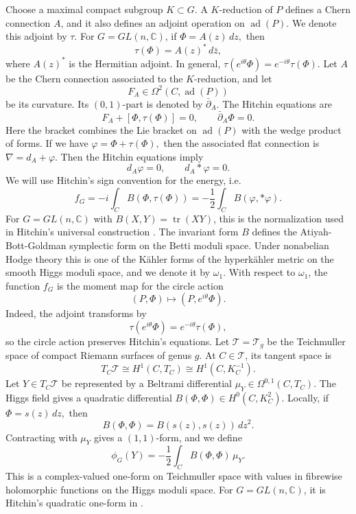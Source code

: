\documentclass[11pt,reqno]{amsart}
\numberwithin{equation}{section}
\theoremstyle{plain}
\theoremstyle{definition}
\theoremstyle{remark}
\begin{document}
Choose a maximal compact subgroup \(K\subset G\). A \(K\)-reduction of \(P\)
defines a Chern connection \(A\), and it also defines an adjoint operation on
\(\operatorname{ad}(P)\). We denote this adjoint by \(\tau\).  For
\(G=GL(n,\mathbb C)\), if
\(
        \Phi=A(z)\,dz,
\)
then
\[
        \tau(\Phi)=A(z)^*\,d\bar z,
\]
where \(A(z)^*\) is the Hermitian adjoint.  In general,
\(
        \tau(e^{i\theta}\Phi)=e^{-i\theta}\tau(\Phi).
\) Let \(A\) be the Chern connection associated to the \(K\)-reduction, and let
\[
        F_A\in\Omega^2(C,\operatorname{ad}(P))
\]
be its curvature. Its \((0,1)\)-part is denoted by \(\bar\partial_A\). The
Hitchin equations are
\[
        F_A+[\Phi,\tau(\Phi)]=0,
        \qquad
        \bar\partial_A\Phi=0.
\]
Here the bracket combines the Lie bracket on \(\operatorname{ad}(P)\) with the
wedge product of forms. If we have
\(
        \varphi=\Phi+\tau(\Phi),
\)
then the associated flat connection is
\(
        \nabla=d_A+\varphi.
\)
Then the Hitchin equations imply
\[
        d_A\varphi=0,
        \qquad
        d_A{*}\varphi=0.
\]
We will use Hitchin's sign convention for the energy, i.e.
\begin{equation}
        f_G
        =
        -i\int_C B(\Phi,\tau(\Phi))
        =
        -\frac12\int_C B(\varphi,*\varphi).
        \label{eq:compact-energy}
\end{equation}
For \(G=GL(n,\mathbb C)\) with \(B(X,Y)=\operatorname{tr}(XY)\), this is the
normalization used in Hitchin's universal construction
\cite[Sec.~2]{HitchinUniversal}. The invariant form \(B\) defines the Atiyah-Bott-Goldman symplectic form on
the Betti moduli space.  Under nonabelian Hodge theory this is one of the
Kähler forms of the hyperkähler metric on the smooth Higgs moduli space, and we
denote it by \(\omega_1\). With respect to \(\omega_1\), the function \(f_G\) is the moment map for the
circle action
\[
        (P,\Phi)\longmapsto (P,e^{i\theta}\Phi).
\]
Indeed, the adjoint transforms by
\[
        \tau(e^{i\theta}\Phi)=e^{-i\theta}\tau(\Phi),
\]
so the circle action preserves Hitchin's equations. Let
\(
        \mathcal T=\mathcal T_g
\)
be the Teichmuller space of compact Riemann surfaces of genus \(g\). At \(C\in\mathcal T\), its tangent space is
\[
        T_C\mathcal T
        \cong
        H^1(C,T_C)
        \cong
        H^1(C,K_C^{-1}).
\]
Let
\(
        Y\in T_C\mathcal T
\)
be represented by a Beltrami differential
\(
        \mu_Y\in\Omega^{0,1}(C,T_C).
\)
The Higgs field gives a quadratic differential
\(
        B(\Phi,\Phi)\in H^0(C,K_C^2).
\)
Locally, if
\(
        \Phi=s(z)\,dz,
\)
then
\[
        B(\Phi,\Phi)=B(s(z),s(z))\,dz^2.
\]
Contracting with \(\mu_Y\) gives a \((1,1)\)-form, and we define
\begin{equation}
        \phi_G(Y)
        =
        -\frac12\int_C B(\Phi,\Phi)\,\mu_Y.
        \label{eq:compact-oneform}
\end{equation}
This is a complex-valued one-form on Teichmuller space with values in fibrewise holomorphic functions on the Higgs moduli space. For \(G=GL(n,\mathbb C)\), it is Hitchin's quadratic one-form in \cite[Sec.~2]{HitchinUniversal}.
\end{document}
